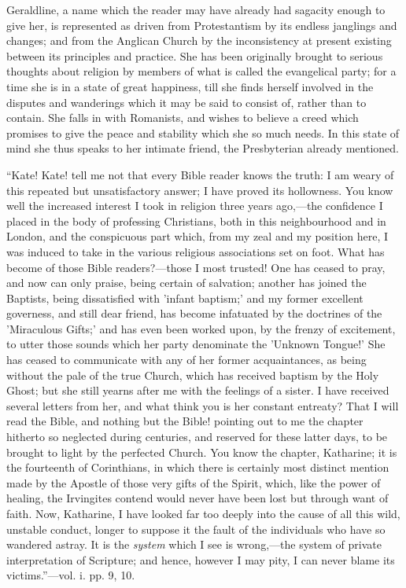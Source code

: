 Geraldline, a name which the reader may have
already had sagacity enough to give her, is represented as driven from
Protestantism by its endless janglings and changes; and from the
Anglican Church by the inconsistency at present existing between its
principles and practice. She has been originally brought to serious
thoughts about religion by members of what is called the evangelical
party; for a time she is in a state of great happiness, till she finds
herself involved in the disputes and wanderings which it may be said to
consist of, rather than to contain. She falls in with Romanists, and
wishes to believe a creed which promises to give the peace and stability
which she so much needs. In this state of mind she thus speaks to her
intimate friend, the Presbyterian already mentioned.

``Kate! Kate! tell me not that every
Bible reader knows the truth: I am weary of this repeated but
unsatisfactory answer; I have proved its hollowness. You know well the
increased interest I took in religion three years ago,—the confidence
I placed in the body of professing Christians, both in this
neighbourhood and in London, and the conspicuous part which, from my
zeal and my position here, I was induced to take in the various
religious associations set on foot. What has become of those Bible
readers?—those I most trusted! One has ceased to pray, and now can
only praise, being certain of salvation; another has joined the
Baptists, being dissatisfied with 'infant baptism;' and my former
excellent governess, and still dear friend, has become infatuated by the
doctrines of the 'Miraculous Gifts;' and has even been worked upon, by
the frenzy of excitement, to utter those sounds which her party
denominate the 'Unknown Tongue!' She has ceased to communicate with any
of her former acquaintances, as being without the pale of the true
Church, which has received baptism by the Holy Ghost; but she still
yearns after me with the feelings of a sister. I have received several
letters from her, and what think you is her constant entreaty? That I
will read the Bible, and nothing but the Bible! pointing out to me the
chapter hitherto so neglected during centuries, and reserved for these
latter days, to be brought to light by the perfected Church. You know
the chapter, Katharine; it is the fourteenth of Corinthians, in which
there is certainly most distinct mention made by the Apostle of those
very gifts of the Spirit, which, like the power of healing, the
Irvingites contend would never have been lost but through want of faith.
Now, Katharine, I have looked far too deeply into the cause of all this
wild, unstable conduct, longer to suppose it the fault of the
individuals who have so wandered astray. It is the \emph{system} which I
see is wrong,—the system of private interpretation of Scripture; and
hence, however I may pity, I can never blame its victims.''—vol. i. pp.
9, 10.


